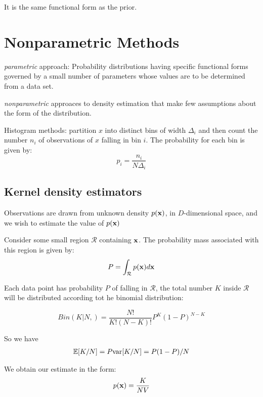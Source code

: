 It is the same functional form as the prior.


\section{Nonparametric Methods}
\emph{parametric} approach: Probability distributions having specific
functional forms governed by a small number of parameters whose values are
to be determined from a data set.

\emph{nonparametric} approaces to density estimation that make few
assumptions about the form of the distribution. 

Histogram methods: partition $x$ into distinct bins of width $\Delta_i$
and then count the number $n_i$ of observations of $x$ falling in bin
$i$. The probability for each bin is given by:
\begin{equation}
    p_i = \frac{n_i}{N\Delta_i}
\end{equation}


\subsection{Kernel density estimators}
Observations are drawn from unknown density $p(\mathbf{x})$, in $D$-dimensional
space, and we wish to estimate the value of $p(\mathbf{x})$

Consider some small region $\mathcal{R}$ containing $\mathbf{x}$. The probability
mass associated with this region is given by:
\begin{equation}
    P = \int_{\mathcal{R}} p(\mathbf{x}) d\mathbf{x}
\end{equation}

Each data point has probability $P$ of falling in $\mathcal{R}$, the
total number $K$ inside $\mathcal{R}$ will be distributed according tot he
binomial distribution:

\begin{equation}
    Bin(K|N,) = \frac{N!}{K!(N-K)!} P^K{(1-P)}^{N-K}
\end{equation}

So we have 
\begin{align*}
    \mathbb{E}[K/N] = P
    \mbox{var}[K/N] = P(1-P)/N
\end{align*}

We obtain our estimate in the form:
\begin{equation}
    p(\mathbf{x}) = \frac{K}{NV}
\end{equation}
